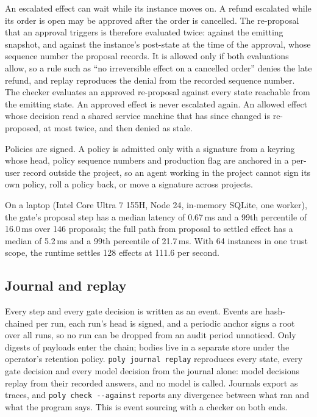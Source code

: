 \documentclass[11pt]{article}
\begin{document}
An escalated effect can wait while its instance moves on. A refund escalated while its order is open may be approved after the order is cancelled. The re-proposal that an approval triggers is therefore evaluated twice: against the emitting snapshot, and against the instance's post-state at the time of the approval, whose sequence number the proposal records. It is allowed only if both evaluations allow, so a rule such as ``no irreversible effect on a cancelled order'' denies the late refund, and replay reproduces the denial from the recorded sequence number. The checker evaluates an approved re-proposal against every state reachable from the emitting state. An approved effect is never escalated again. An allowed effect whose decision read a shared service machine that has since changed is re-proposed, at most twice, and then denied as stale.

Policies are signed. A policy is admitted only with a signature from a keyring whose head, policy sequence numbers and production flag are anchored in a per-user record outside the project, so an agent working in the project cannot sign its own policy, roll a policy back, or move a signature across projects.

On a laptop (Intel Core Ultra 7 155H, Node 24, in-memory SQLite, one worker), the gate's proposal step has a median latency of 0.67\,ms and a 99th percentile of 16.0\,ms over 146 proposals; the full path from proposal to settled effect has a median of 5.2\,ms and a 99th percentile of 21.7\,ms. With 64 instances in one trust scope, the runtime settles 128 effects at 111.6 per second.

\subsection{Journal and replay}

Every step and every gate decision is written as an event. Events are hash-chained per run, each run's head is signed, and a periodic anchor signs a root over all runs, so no run can be dropped from an audit period unnoticed. Only digests of payloads enter the chain; bodies live in a separate store under the operator's retention policy. \texttt{poly journal replay} reproduces every state, every gate decision and every model decision from the journal alone: model decisions replay from their recorded answers, and no model is called. Journals export as traces, and \texttt{poly check -{}-against} reports any divergence between what ran and what the program says. This is event sourcing \cite{fowler2005es} with a checker on both ends.
\end{document}
